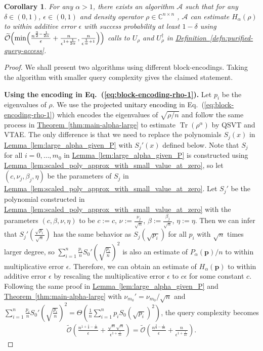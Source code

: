 \documentclass[journal]{IEEEtran}
\newtheorem{corollary}{Corollary}
\newcommand{\eq}[1]{Eq.~(\ref{eq:#1})}
\newcommand{\thm}[1]{\hyperref[thm:#1]{Theorem~\ref*{thm:#1}}}
\newcommand{\defn}[1]{\hyperref[defn:#1]{Definition~\ref*{defn:#1}}}
\newcommand{\lem}[1]{\hyperref[lem:#1]{Lemma~\ref*{lem:#1}}}
\def\Tr{\operatorname{Tr}}\def\atanh{\operatorname{atanh}}\def\:{\hbox{\bf:}}
\begin{document}
\begin{corollary}
\label{cor:main-alpha-large-purified}
  For any $\alpha > 1$, there exists an algorithm $\mathcal{A}$ such that for any $\delta \in (0,1)$, $\epsilon\in(0,1)$ and density operator $\rho \in \mathbb{C}^{n\times n}$ , $\mathcal{A}$ can estimate $H_{\alpha}(\rho)$ to within additive error $\epsilon$
  with success probability at least $1-\delta$ using ${\widetilde{\mathcal{O}}\Bigl(\min\Bigl(\frac{n^{\frac{3}{2}-\frac{1}{2\alpha}}}{\epsilon} + \frac{n}{\epsilon^{1+\frac{1}{2\alpha}}}, \frac{n}{\epsilon^{\frac{1}{\alpha}+1}}\Bigr)\Bigr)}$ calls to $U_{\rho}$ and $U_{\rho}^{\dagger}$ in \defn{purified-query-access}.
\end{corollary}
\begin{proof}
We shall present two algorithms using different block-encodings. Taking the algorithm with smaller query complexity gives the claimed statement.


\textbf{Using the encoding in \eq{block-encoding-rho-1}.}
  Let $p_i$ be the eigenvalues of $\rho$. We use the \textcolor{black}{projected unitary encoding} in \eq{block-encoding-rho-1} which encodes the eigenvalues of $\sqrt{\rho/n}$  and follow the same process in \thm{main-alpha-large} to estimate $\Tr(\rho^\alpha)$ by QSVT and VTAE. The only difference is that we need to replace the polynomials $S_j(x)$ in \lem{large_alpha_given_P} with $S_j'(x)$ defined below. Note that $S_j$ for all $i= 0,\ldots,m_0$ in \lem{large_alpha_given_P} is constructed using \lem{scaled_poly_approx_with_small_value_at_zero}, so let $(c,\nu_j,\beta_j,\eta)$ be the parameters of $S_j$ in \lem{scaled_poly_approx_with_small_value_at_zero}. Let $S_j'$ be the polynomial constructed in \lem{scaled_poly_approx_with_small_value_at_zero} with the parameters $(c,\beta,\nu,\eta)$ to be $c := c$, $\nu:=\frac{\nu_j}{\sqrt{n}}$, $\beta:=\frac{\beta_j}{\sqrt{n}}$, $\eta:=\eta$. Then we can infer that $S_j'(\frac{\sqrt{p_i}}{\sqrt{n}})$ has the same behavior as $S_j(\sqrt{p_i})$ for all $p_i$ with $\sqrt{n}$ times larger degree, so $ \sum_{i=1}^n \frac{p_i}{n}S_0'(\sqrt{\frac{p_i}{n}})^2$
  is also an estimate of $P_{\alpha}(\mathbf{p})/n$ to within multiplicative error $\epsilon$. Therefore, we can obtain an estimate of $H_{\alpha}(\mathbf{p})$ to within additive error $\epsilon$ by rescaling the multiplicative error $\epsilon$ to $c\epsilon$ for some constant $c$. Following the same proof in \lem{large_alpha_given_P} and \thm{main-alpha-large} with $\nu_{m_0}' =  \nu_{m_0}/\sqrt{n}$ and $\sum_{i=1}^n \frac{p_i}{n}S_0'(\sqrt{\frac{p_i}{n}})^2 = \Theta(\frac{1}{n} \sum_{i=1}^n p_i S_0(\sqrt{p_i})^2)$, the query complexity becomes 
  \begin{align}
      \widetilde{\mathcal{O}}\left(\frac{n^{1+\frac{1}{2}-\frac{1}{2\alpha}}}{\epsilon} + \frac{\sqrt{n}\sqrt{n}}{\epsilon^{1+\frac{1}{2\alpha}}}\right) =\widetilde{\mathcal{O}}\left(\frac{n^{\frac{3}{2}-\frac{1}{2\alpha}}}{\epsilon} + \frac{n}{\epsilon^{1+\frac{1}{2\alpha}}}\right) .
  \end{align}


\end{proof}
\end{document}

